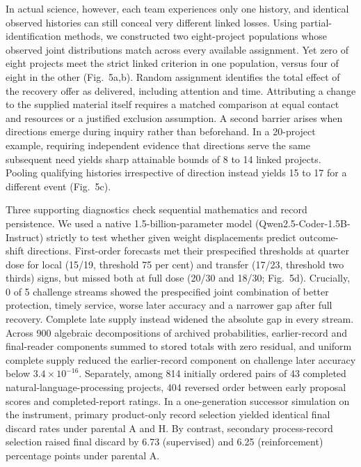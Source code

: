 In actual science, however, each team experiences only one history, and identical observed histories can still conceal very different linked losses. Using partial-identification methods,\cite{TIAN,FRANG} we constructed two eight-project populations whose observed joint distributions match across every available assignment. Yet zero of eight projects meet the strict linked criterion in one population, versus four of eight in the other (Fig.~5a,b). Random assignment identifies the total effect of the recovery offer as delivered, including attention and time. Attributing a change to the supplied material itself requires a matched comparison at equal contact and resources or a justified exclusion assumption. A second barrier arises when directions emerge during inquiry rather than beforehand. In a 20-project example, requiring independent evidence that directions serve the same subsequent need yields sharp attainable bounds of 8 to 14 linked projects. Pooling qualifying histories irrespective of direction instead yields 15 to 17 for a different event (Fig.~5c).

Three supporting diagnostics check sequential mathematics and record persistence. We used a native 1.5-billion-parameter model (Qwen2.5-Coder-1.5B-Instruct) strictly to test whether given weight displacements predict outcome-shift directions.\cite{KERNEL,QWC} First-order forecasts met their prespecified thresholds at quarter dose for local (15/19, threshold 75 per cent) and transfer (17/23, threshold two thirds) signs, but missed both at full dose (20/30 and 18/30; Fig.~5d). Crucially, 0 of 5 challenge streams showed the prespecified joint combination of better protection, timely service, worse later accuracy and a narrower gap after full recovery. Complete late supply instead widened the absolute gap in every stream. Across 900 algebraic decompositions of archived probabilities, earlier-record and final-reader components summed to stored totals with zero residual, and uniform complete supply reduced the earlier-record component on challenge later accuracy below \(3.4\times10^{-16}\). Separately, among 814 initially ordered pairs of 43 completed natural-language-processing projects, 404 reversed order between early proposal scores and completed-report ratings.\cite{SI26} In a one-generation successor simulation on the instrument, primary product-only record selection yielded identical final discard rates under parental A and H. By contrast, secondary process-record selection raised final discard by 6.73 (supervised) and 6.25 (reinforcement) percentage points under parental A.

